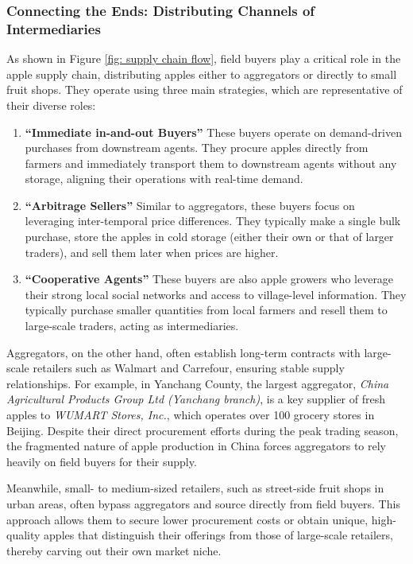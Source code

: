 \subsubsection{Connecting the Ends: Distributing Channels of Intermediaries}
\noindent As shown in Figure \ref{fig: supply chain flow}, field buyers play a critical role in the apple supply chain, distributing apples either to aggregators or directly to small fruit shops. They operate using three main strategies, which are representative of their diverse roles:

\begin{enumerate}
    \item \textbf{``Immediate in-and-out Buyers''} These buyers operate on demand-driven purchases from downstream agents. They procure apples directly from farmers and immediately transport them to downstream agents without any storage, aligning their operations with real-time demand.

    \item \textbf{``Arbitrage Sellers''} Similar to aggregators, these buyers focus on leveraging inter-temporal price differences. They typically make a single bulk purchase, store the apples in cold storage (either their own or that of larger traders), and sell them later when prices are higher.

    \item \textbf{``Cooperative Agents''} These buyers are also apple growers who leverage their strong local social networks and access to village-level information. They typically purchase smaller quantities from local farmers and resell them to large-scale traders, acting as intermediaries.
\end{enumerate}

Aggregators, on the other hand, often establish long-term contracts with large-scale retailers such as Walmart and Carrefour, ensuring stable supply relationships. For example, in Yanchang County, the largest aggregator, \textit{China Agricultural Products Group Ltd (Yanchang branch)}, is a key supplier of fresh apples to \textit{WUMART Stores, Inc.}, which operates over 100 grocery stores in Beijing. Despite their direct procurement efforts during the peak trading season, the fragmented nature of apple production in China forces aggregators to rely heavily on field buyers for their supply.

Meanwhile, small- to medium-sized retailers, such as street-side fruit shops in urban areas, often bypass aggregators and source directly from field buyers. This approach allows them to secure lower procurement costs or obtain unique, high-quality apples that distinguish their offerings from those of large-scale retailers, thereby carving out their own market niche.

